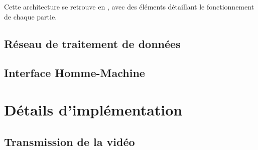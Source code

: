 			Cette architecture se retrouve en \todoref, avec des éléments détaillant le fonctionnement de chaque partie.

		\subsection{Réseau de traitement de données}

			
		\subsection{Interface Homme-Machine}
		\label{sub:ihm}


	\section{Détails d'implémentation}
	
		\subsection{Transmission de la vidéo}
		
